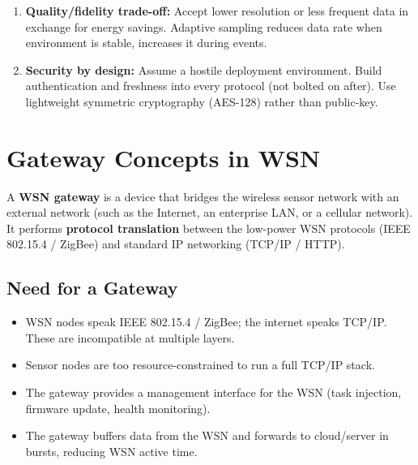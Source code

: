 \documentclass[12pt,a4paper]{article}
\begin{document}
\begin{tcolorbox}[formulabox, title={\textbf{Core WSN Design Principles}}]
\begin{enumerate}[leftmargin=*, itemsep=5pt]
  \item \textbf{Quality/fidelity trade-off:} Accept lower resolution or less frequent data in exchange for energy savings. Adaptive sampling reduces data rate when environment is stable, increases it during events.

  \item \textbf{Security by design:} Assume a hostile deployment environment. Build authentication and freshness into every protocol (not bolted on after). Use lightweight symmetric cryptography (AES-128) rather than public-key.
\end{enumerate}
\end{tcolorbox}

\section{Gateway Concepts in WSN}

\begin{tcolorbox}[defbox, title={\textbf{WSN Gateway --- Definition}}]
A \textbf{WSN gateway} is a device that bridges the wireless sensor network with an external network (such as the Internet, an enterprise LAN, or a cellular network). It performs \textbf{protocol translation} between the low-power WSN protocols (IEEE 802.15.4 / ZigBee) and standard IP networking (TCP/IP / HTTP).
\end{tcolorbox}

\subsection{Need for a Gateway}

\begin{itemize}[leftmargin=*, itemsep=3pt]
  \item WSN nodes speak IEEE 802.15.4 / ZigBee; the internet speaks TCP/IP. These are incompatible at multiple layers.
  \item Sensor nodes are too resource-constrained to run a full TCP/IP stack.
  \item The gateway provides a management interface for the WSN (task injection, firmware update, health monitoring).
  \item The gateway buffers data from the WSN and forwards to cloud/server in bursts, reducing WSN active time.
\end{itemize}
\end{document}
